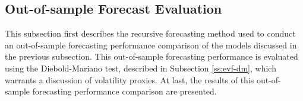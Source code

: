 
\newpage
\subsection{Out-of-sample Forecast Evaluation}\label{ss:app-oos-forecast}
This subsection first describes the recursive forecasting method used to conduct an out-of-sample forecasting performance comparison of the models discussed in the previous subsection. This out-of-sample forecasting performance is evaluated using the Diebold-Mariano test, described in Subsection \ref{ss:evf-dm}, which warrants a discussion of volatility proxies. At last, the results of this out-of-sample forecasting performance comparison are presented.

